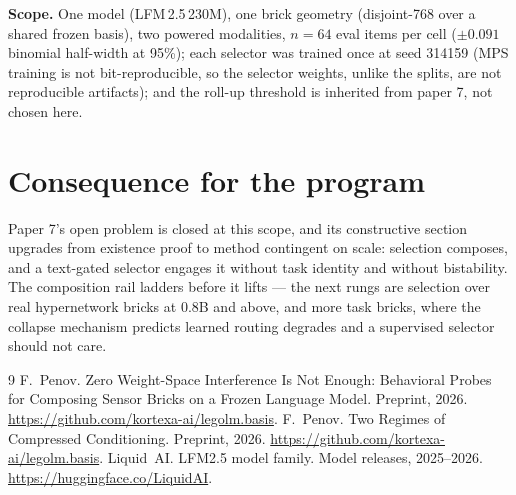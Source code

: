 \documentclass[11pt]{article}
\begin{document}
\textbf{Scope.} One model (LFM\,2.5\,230M), one brick geometry
(disjoint-768 over a shared frozen basis), two powered modalities, $n=64$
eval items per cell ($\pm 0.091$ binomial half-width at 95\%); each selector
was trained once at seed 314159 (MPS training is not
bit-reproducible, so the selector weights, unlike the splits, are not
reproducible artifacts); and the roll-up threshold is inherited from paper 7,
not chosen here.

\section{Consequence for the program}

Paper 7's open problem is closed at this scope, and its constructive section
upgrades from existence proof to method contingent on scale: selection
composes, and a text-gated selector engages it without task identity and
without bistability. The composition rail ladders before it lifts --- the
next rungs are selection over real hypernetwork bricks at 0.8B and above,
and more task bricks, where the collapse mechanism predicts learned routing
degrades and a supervised selector should not care.

\begin{thebibliography}{9}
 F.~Penov. Zero Weight-Space Interference Is
Not Enough: Behavioral Probes for Composing Sensor Bricks on a Frozen
Language Model. Preprint, 2026.
\url{https://github.com/kortexa-ai/legolm.basis}.
 F.~Penov. Two Regimes of Compressed Conditioning.
Preprint, 2026. \url{https://github.com/kortexa-ai/legolm.basis}.
 Liquid~AI. LFM2.5 model family. Model releases,
2025--2026. \url{https://huggingface.co/LiquidAI}.
\end{thebibliography}
\end{document}
